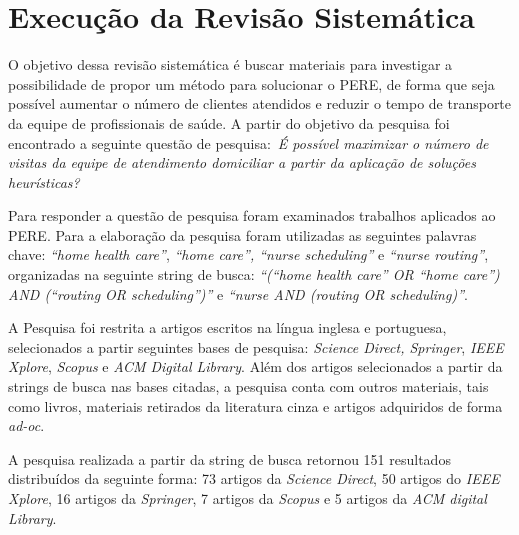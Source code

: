 \section{Execução da Revisão Sistemática}

O objetivo dessa revisão sistemática é buscar materiais para investigar a possibilidade de propor um método para solucionar o \ac{PERE}, de forma que seja possível aumentar  o número de clientes atendidos e reduzir o tempo de transporte da equipe de profissionais de saúde. 
A partir do objetivo da pesquisa foi encontrado a seguinte questão de pesquisa:~\emph{É possível maximizar o número de visitas da equipe de atendimento domiciliar a partir da aplicação de soluções heurísticas?}

Para responder a questão de pesquisa foram examinados trabalhos aplicados ao \ac{PERE}.
Para a elaboração da pesquisa foram utilizadas as seguintes palavras chave: \textit{``home health care''}, \textit{``home care'', ``nurse scheduling''} e \textit{``nurse routing''}, organizadas na seguinte string de busca: \textit{``(``home health care'' OR ``home care'') AND (``routing OR scheduling'')''} e \textit{``nurse AND (routing OR scheduling)''}. 

A Pesquisa foi restrita a artigos escritos na língua inglesa e portuguesa, selecionados a partir seguintes bases de pesquisa: \textit{Science Direct, Springer}, \textit{IEEE Xplore}, \textit{Scopus} e \textit{ACM Digital Library}. Além dos artigos selecionados a partir da strings de busca nas bases citadas, a pesquisa conta com outros materiais, tais como livros, materiais retirados da literatura cinza e artigos adquiridos de forma \textit{ad-oc}.

A pesquisa realizada a partir da string de busca retornou 151 resultados distribuídos da seguinte forma: 73 artigos da \textit{Science Direct}, 50 artigos do \textit{IEEE Xplore}, 16 artigos da \textit{Springer}, 7 artigos da \textit{Scopus} e 5 artigos da \textit{ACM digital Library}.%



